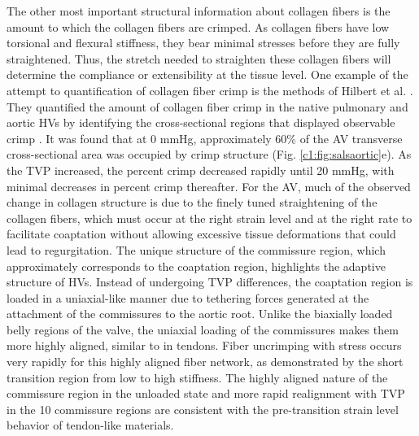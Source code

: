     
    The other most important structural information about collagen fibers is the amount to which the collagen fibers are crimped. As collagen fibers have low torsional and flexural stiffness, they bear minimal stresses before they are fully straightened. Thus, the stretch needed to straighten these collagen fibers will determine the compliance or extensibility at the tissue level. One example of the attempt to quantification of collagen fiber crimp is the methods of Hilbert et al. \cite{hilbert_optical_1986, hilbert_porcine_1990}. They quantified the amount of collagen fiber crimp in the native pulmonary and aortic HVs by identifying the cross-sectional regions that displayed observable crimp \cite{joyce_functional_2009}. It was found that at 0 mmHg, approximately 60\% of the AV transverse cross-sectional area was occupied by crimp structure (Fig. \ref{c1:fig:salsaortic}e). As the TVP increased, the percent crimp decreased rapidly until 20 mmHg, with minimal decreases in percent crimp thereafter. For the AV, much of the observed change in collagen structure is due to the finely tuned straightening of the collagen fibers, which must occur at the right strain level and at the right rate to facilitate coaptation without allowing excessive tissue deformations that could lead to regurgitation. The unique structure of the commissure region, which approximately corresponds to the coaptation region, highlights the adaptive structure of HVs. Instead of undergoing TVP differences, the coaptation region is loaded in a uniaxial-like manner due to tethering forces generated at the attachment of the commissures to the aortic root. Unlike the biaxially loaded belly regions of the valve, the uniaxial loading of the commissures makes them more highly aligned, similar to in tendons. Fiber uncrimping with stress occurs very rapidly for this highly aligned fiber network, as demonstrated by the short transition region from low to high stiffness. The highly aligned nature of the commissure region in the unloaded state and more rapid realignment with TVP in the 10 commissure regions are consistent with the pre-transition strain level behavior of tendon-like materials. 
